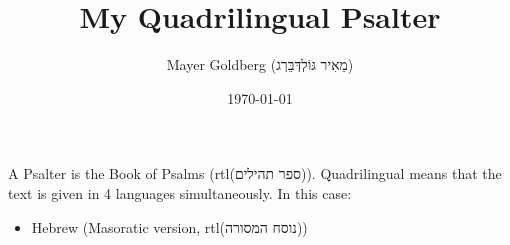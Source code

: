 \documentclass[11pt]{article}
\author{Mayer Goldberg (מֵאִיר גּוֹלְדְּבֵּרְג)}
\date{\today}
\title{My Quadrilingual Psalter}
\begin{document}
\maketitle
\tableofcontents

A Psalter is the Book of Psalms (rtl(ספר תהילים)). Quadrilingual means that the text is given in 4 languages simultaneously. In this case:
\begin{itemize}
\item Hebrew (Masoratic version, rtl(נוסח המסורה))
\end{itemize}
\end{document}
